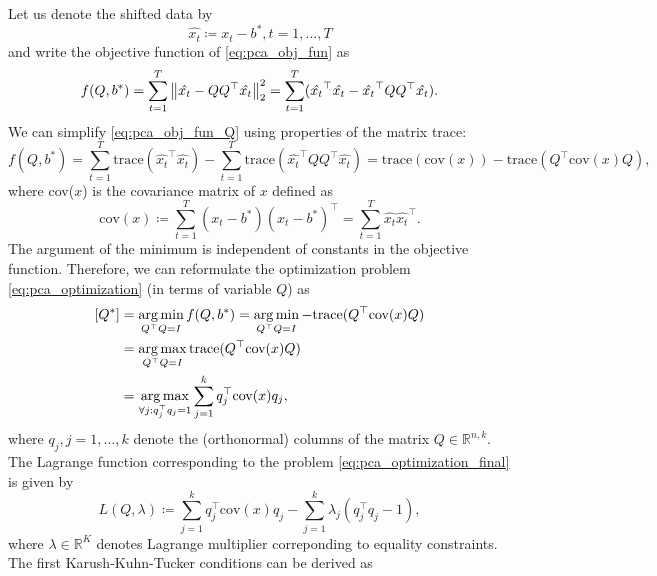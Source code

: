 Let us denote the shifted data by
\begin{equation}
    \hat{x_t} \coloneqq x_t - b^* , t=1, \dots, T
\end{equation}
and write the objective function of \eqref{eq:pca_obj_fun} as
\begin{equation}
    f(Q,b^*) = \sum_{t=1}^T \left\lVert\hat{x_t} - QQ^{\top}\hat{x_t}\right\rVert_2^2 = \sum_{t=1}^T (\hat{x_t}^{\top}\hat{x_t} - \hat{x_t}^{\top} QQ^{\top} \hat{x_t}).
    \label{eq:pca_obj_fun_Q}
\end{equation}
We can simplify \eqref{eq:pca_obj_fun_Q} using properties of the matrix trace:
\begin{equation}
    f(Q,b^*) = \sum_{t=1}^T \text{trace} (\hat{x_t}^{\top}\hat{x_t}) - \sum_{t=1}^T \text{trace} (\hat{x_t}^{\top} QQ^{\top} \hat{x_t})
    = \text{trace}(\text{cov}(x)) - \text{trace}(Q^{\top} \text{cov}(x) Q ),
\end{equation}
where cov($x$) is the covariance matrix of $x$ defined as
\begin{equation}
    \text{cov}(x) \coloneqq \sum_{t=1}^T(x_t-b^*)(x_t-b^*)^{\top} = \sum_{t=1}^T\hat{x_t}\hat{x_t}^{\top}.
\end{equation}
The argument of the minimum is independent of constants in the objective function. Therefore, we can reformulate the optimization problem \eqref{eq:pca_optimization} (in terms of variable $Q$) as
\begin{equation}
    \begin{split}
        [Q^*] &= \operatorname*{arg\,min}_{Q^{\top}Q=I} f(Q,b^*) = \operatorname*{arg\,min}_{Q^{\top}Q=I} -\text{trace}(Q^{\top}\text{cov}(x)Q) \\&= \operatorname*{arg\,max}_{Q^{\top}Q=I} \text{trace}(Q^{\top}\text{cov}(x)Q) \\&= \operatorname*{arg\,max}_{\forall j:q_j^{\top}q_j=1} \sum_{j=1}^k q_j^{\top} \text{cov}(x) q_j,
    \end{split}
    \label{eq:pca_optimization_final}
\end{equation}
where $q_j , j=1,\dots,k$ denote the (orthonormal) columns of the matrix $Q \in \mathbb{R}^{n,k}$. The Lagrange function corresponding to the problem \eqref{eq:pca_optimization_final} is given by
\begin{equation}
    L(Q, \lambda) \coloneqq \sum_{j=1}^k q_j^{\top} \text{cov}(x)q_j - \sum_{j=1}^k \lambda_j (q_j^{\top} q_j - 1),
\end{equation}
where $\lambda \in \mathbb{R}^K$ denotes Lagrange multiplier correponding to equality constraints. The first Karush-Kuhn-Tucker conditions can be derived as

